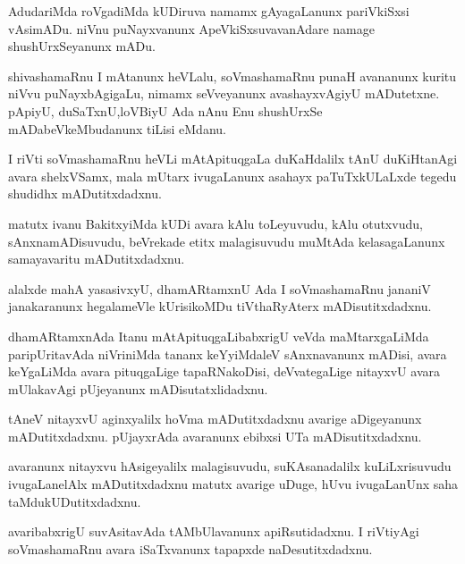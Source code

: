 \documentclass{article}
\begin{document}
\begin{mn}
AdudariMda roVgadiMda kUDiruva namamx gAyagaLanunx pariVkiSxsi vAsimADu.  
niVnu puNayxvanunx ApeVkiSxsuvavanAdare namage shushUrxSeyanunx mADu.
\end{mn}

\begin{mn}
shivashamaRnu I mAtanunx heVLalu, soVmashamaRnu punaH avananunx
kuritu niVvu puNayxbAgigaLu, nimamx seVveyanunx avashayxvAgiyU mADutetxne.
pApiyU, duSaTxnU,loVBiyU Ada nAnu Enu shushUrxSe mADabeVkeMbudanunx tiLisi eMdanu.
\end{mn}

\begin{mn}
I riVti soVmashamaRnu heVLi mAtApituqgaLa duKaHdalilx tAnU duKiHtanAgi 
avara shelxVSamx, mala mUtarx ivugaLanunx asahayx paTuTxkULaLxde tegedu 
shudidhx mADutitxdadxnu.
\end{mn}

\begin{mn}
matutx ivanu BakitxyiMda kUDi avara kAlu toLeyuvudu, kAlu otutxvudu, 
sAnxnamADisuvudu, beVrekade etitx malagisuvudu muMtAda kelasagaLanunx 
samayavaritu mADutitxdadxnu.
\end{mn}

\begin{mn}
alalxde mahA yasasivxyU, dhamARtamxnU Ada I soVmashamaRnu jananiV 
janakaranunx hegalameVle kUrisikoMDu tiVthaRyAterx mADisutitxdadxnu.
\end{mn}

\begin{mn}
dhamARtamxnAda Itanu mAtApituqgaLibabxrigU veVda maMtarxgaLiMda 
paripUritavAda niVriniMda tananx keYyiMdaleV sAnxnavanunx mADisi, avara 
keYgaLiMda avara pituqgaLige tapaRNakoDisi, deVvategaLige nitayxvU avara
mUlakavAgi pUjeyanunx mADisutatxlidadxnu. 
\end{mn}

\begin{mn}
tAneV nitayxvU aginxyalilx hoVma mADutitxdadxnu avarige aDigeyanunx 
mADutitxdadxnu. pUjayxrAda avaranunx ebibxsi UTa mADisutitxdadxnu.
\end{mn}

\begin{mn}
avaranunx nitayxvu hAsigeyalilx malagisuvudu, suKAsanadalilx 
kuLiLxrisuvudu ivugaLanelAlx mADutitxdadxnu matutx avarige uDuge, hUvu 
ivugaLanUnx saha taMdukUDutitxdadxnu.
\end{mn}

\begin{mn}
avaribabxrigU suvAsitavAda tAMbUlavanunx apiRsutidadxnu. I riVtiyAgi
soVmashamaRnu avara iSaTxvanunx tapapxde naDesutitxdadxnu.
\end{mn}
\end{document}
